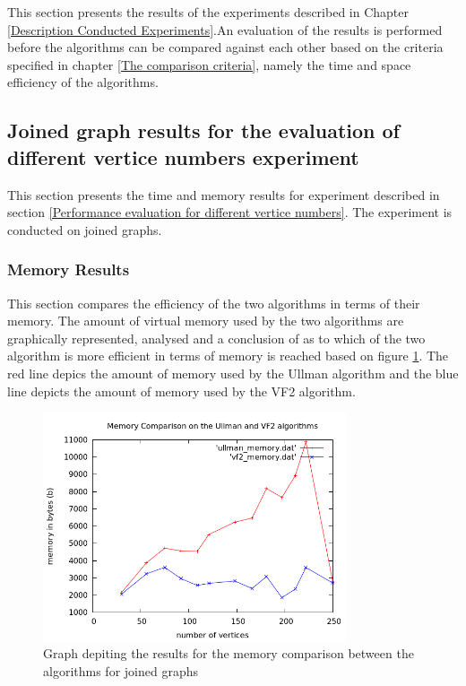 \label{Experiment Results}
This section presents the results of the experiments described in Chapter \ref{Description Conducted Experiments}.An evaluation of the results is
performed before the algorithms can be compared against each other based on the criteria specified in chapter \ref{The comparison criteria}, namely the time and 
space efficiency of the algorithms.

\subsection{Joined graph results for the evaluation of different vertice numbers experiment}
This section presents the time and memory results for experiment described in section \ref{Performance evaluation for different vertice numbers}. The 
experiment is conducted on joined graphs.
\subsubsection{Memory Results}
\label{Memory Results}
This section compares the efficiency of the two algorithms in terms of their memory. The amount of virtual memory used by the two algorithms are graphically 
represented, analysed and a conclusion of as to which of the two algorithm is more efficient in terms of memory is reached based on figure \ref{fig:memory_comparison}.
The red line depics the amount of memory used by the Ullman algorithm and the blue line depicts the amount of memory used by the VF2 algorithm.
\begin{figure}[H]
  \begin{center}
      \includegraphics[width=0.8\textwidth]{memory_comparison.png}
  \end{center}    
  \caption{Graph depiting the results for the memory comparison between the algorithms for joined graphs}
  \label{fig:memory_comparison}
\end{figure}

